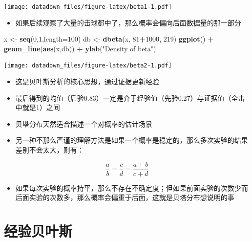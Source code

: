 \documentclass[
]{book}
\newenvironment{Shaded}{\begin{snugshade}}{\end{snugshade}}
\newcommand{\DataTypeTok}[1]{\textcolor[rgb]{0.13,0.29,0.53}{#1}}
\newcommand{\DecValTok}[1]{\textcolor[rgb]{0.00,0.00,0.81}{#1}}
\newcommand{\KeywordTok}[1]{\textcolor[rgb]{0.13,0.29,0.53}{\textbf{#1}}}
\newcommand{\NormalTok}[1]{#1}
\newcommand{\OperatorTok}[1]{\textcolor[rgb]{0.81,0.36,0.00}{\textbf{#1}}}
\newcommand{\StringTok}[1]{\textcolor[rgb]{0.31,0.60,0.02}{#1}}
\providecommand{\tightlist}{%
  \setlength{\itemsep}{0pt}\setlength{\parskip}{0pt}}
\begin{document}
\texttt{[image: datadown\_files/figure-latex/beta1-1.pdf]}

\begin{itemize}
\tightlist
\item
  如果后续观察了大量的击球都中了，那么概率会偏向后面数据量的那一部分
\end{itemize}

\begin{Shaded}
\begin{Highlighting}[]
\NormalTok{x <-}\StringTok{ }\KeywordTok{seq}\NormalTok{(}\DecValTok{0}\NormalTok{,}\DecValTok{1}\NormalTok{,}\DataTypeTok{length=}\DecValTok{100}\NormalTok{)}
\NormalTok{db <-}\StringTok{ }\KeywordTok{dbeta}\NormalTok{(x, }\DecValTok{81}\OperatorTok{+}\DecValTok{1000}\NormalTok{, }\DecValTok{219}\NormalTok{)}
\KeywordTok{ggplot}\NormalTok{() }\OperatorTok{+}\StringTok{ }\KeywordTok{geom_line}\NormalTok{(}\KeywordTok{aes}\NormalTok{(x,db)) }\OperatorTok{+}\StringTok{ }\KeywordTok{ylab}\NormalTok{(}\StringTok{"Density of beta"}\NormalTok{)}
\end{Highlighting}
\end{Shaded}

\texttt{[image: datadown\_files/figure-latex/beta2-1.pdf]}

\begin{itemize}
\item
  这是贝叶斯分析的核心思想，通过证据更新经验
\item
  最后得到的均值（后验0.83）一定是介于经验值（先验0.27）与证据值（全击中就是1）之间
\item
  贝塔分布天然适合描述一个对概率的估计场景
\item
  另一种不那么严谨的理解方法是如果一个概率是稳定的，那么多次实验的结果差别不会太大，则有：
\end{itemize}

\[\frac{a}{b} = \frac{c}{d} = \frac{a+b}{c+d}\]

\begin{itemize}
\tightlist
\item
  如果每次实验的概率持平，那么不存在不确定度；但如果前面实验的次数少而后面实验的次数多，那么概率会偏重于后面，这就是贝塔分布想说明的事
\end{itemize}

\hypertarget{ux7ecfux9a8cux8d1dux53f6ux65af}{%
\section{经验贝叶斯}\label{ux7ecfux9a8cux8d1dux53f6ux65af}}
\end{document}
